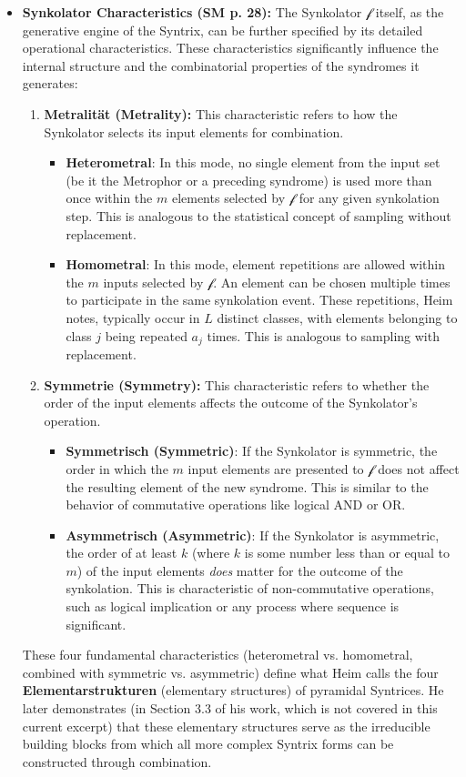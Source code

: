 \documentclass[12pt]{article}
\newcommand{\synkolator}{\mathcal{f}}
\newcommand{\synkolationsstufe}{m}
\begin{document}
\begin{itemize}
    \item \textbf{Synkolator Characteristics (SM p. 28):}
    The Synkolator \( \synkolator \) itself, as the generative engine of the Syntrix, can be further specified by its detailed operational characteristics. These characteristics significantly influence the internal structure and the combinatorial properties of the syndromes it generates:
    \begin{enumerate}
        \item \textbf{Metralität (Metrality):} This characteristic refers to how the Synkolator selects its input elements for combination.
        \begin{itemize}
            \item \textbf{Heterometral}: In this mode, no single element from the input set (be it the Metrophor or a preceding syndrome) is used more than once within the \( \synkolationsstufe \) elements selected by \( \synkolator \) for any given synkolation step. This is analogous to the statistical concept of sampling without replacement.
            \item \textbf{Homometral}: In this mode, element repetitions are allowed within the \( \synkolationsstufe \) inputs selected by \( \synkolator \). An element can be chosen multiple times to participate in the same synkolation event. These repetitions, Heim notes, typically occur in \( L \) distinct classes, with elements belonging to class \( j \) being repeated \( a_j \) times. This is analogous to sampling with replacement.
        \end{itemize}
        \item \textbf{Symmetrie (Symmetry):} This characteristic refers to whether the order of the input elements affects the outcome of the Synkolator's operation.
        \begin{itemize}
            \item \textbf{Symmetrisch (Symmetric)}: If the Synkolator is symmetric, the order in which the \( \synkolationsstufe \) input elements are presented to \( \synkolator \) does not affect the resulting element of the new syndrome. This is similar to the behavior of commutative operations like logical AND or OR.
            \item \textbf{Asymmetrisch (Asymmetric)}: If the Synkolator is asymmetric, the order of at least \( k \) (where \( k \) is some number less than or equal to \( \synkolationsstufe \)) of the input elements \textit{does} matter for the outcome of the synkolation. This is characteristic of non-commutative operations, such as logical implication or any process where sequence is significant.
        \end{itemize}
    \end{enumerate}
    These four fundamental characteristics (heterometral vs. homometral, combined with symmetric vs. asymmetric) define what Heim calls the four \textbf{Elementarstrukturen} (elementary structures) of pyramidal Syntrices. He later demonstrates (in Section 3.3 of his work, which is not covered in this current excerpt) that these elementary structures serve as the irreducible building blocks from which all more complex Syntrix forms can be constructed through combination.


\end{itemize}
\end{document}
